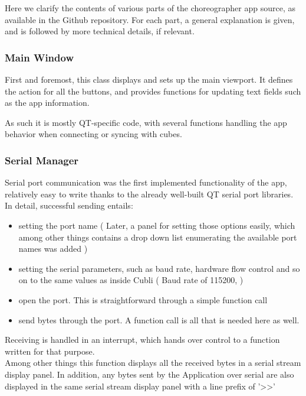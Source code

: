 Here we clarify the contents of various parts of the choreographer app source, as available in the Github repository. For each part, a general explanation is given, and is followed by more technical details, if relevant.

\subsubsection{Main Window}

First and foremost, this class displays and sets up the main viewport. It defines the action for all the buttons, and provides functions for updating text fields such as the app information.

As such it is mostly QT-specific code, with several functions handling the app behavior when connecting or syncing with cubes.

\subsubsection{Serial Manager}

Serial port communication was the first implemented functionality of the app, relatively easy to write thanks to the already well-built QT serial port libraries. In detail, successful sending entails: 

\begin{itemize}
\item setting the port name ( Later, a panel for setting those options easily, which among other things contains a drop down list enumerating the available port names was added ) 
\item setting the serial parameters, such as baud rate, hardware flow control and so on to the same values as inside Cubli ( Baud rate of 115200, ) 
\item open the port. This is straightforward through a simple function call 
\item send bytes through the port. A function call is all that is needed here as well. 
\end{itemize}

Receiving is handled in an interrupt, which hands over control to a function written for that purpose.\\

Among other things this function displays all the received bytes in a serial stream display panel. In addition, any bytes sent by the Application over serial are also displayed in the same serial stream display panel with a line prefix of '>>' \\

